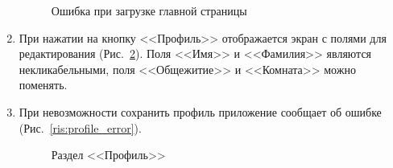 \documentclass{../includes/TechDoc}
\begin{document}
\begin{enumerate}
\begin{figure}[h]
\begin{center}
\begin{minipage}[h]{0.3\linewidth}
                    \caption{Ошибка при загрузке главной страницы}
                    \label{ris:main_page_error}
                \end{minipage}
            \end{center}
        \end{figure}

        \item При нажатии на кнопку <<Профиль>> отображается экран с полями для редактирования (Рис.~\ref{ris:profile}).
        Поля <<Имя>> и <<Фамилия>> являются некликабельными, поля <<Общежитие>> и <<Комната>> можно поменять.
        \item При невозможности сохранить профиль приложение сообщает об ошибке (Рис.~\ref{ris:profile_error}).
        \begin{figure}[h]
            \begin{center}
                \begin{minipage}[h]{0.49\linewidth}
                    \caption{Раздел <<Профиль>>} %
                    \label{ris:profile} %
                \end{minipage}
                \hfill
                \begin{minipage}[h]{0.49\linewidth}

\end{minipage}
\end{center}
\end{figure}
\end{enumerate}
\end{document}
